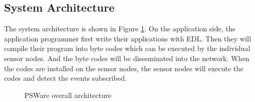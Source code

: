 \subsection{System Architecture}
The system architecture is shown in Figure \ref{fig:psware-architecture}. On the application side, the application programmer first write their applications with EDL. Then they will compile their program into byte codes which can be executed by the individual sensor nodes. And the byte codes will be disseminated into the network. When the codes are installed on the sensor nodes, the sensor nodes will execute the codes and detect the events subscribed.

\begin{figure}
\centering
{}
\caption{PSWare overall architecture}
\label{fig:psware-architecture}
\end{figure}

